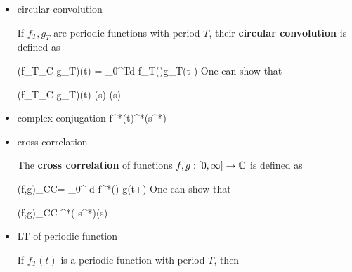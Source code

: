 \begin{itemize}
It's not hard to show that

\beq
f\circledast g = g\circledast f
\eeq
and that

\beq
(f\circledast  g)(t) \maparrow{\call}(s)(s)
\label{eq-lt-conv}
\eeq
Eq.(\ref{eq-lt-conv})
is easy to check
with phasors.
Indeed, if we substitute
$f(\tau)=e^{i\omega_0\tau}\TIL{f}$
and
$g(t-\tau)=
e^{i\omega_0(t-\tau)}\TIL{g}$,
on the right side
of Eq.(\ref{eq-conv-left-half-zero}),
the right side
becomes $e^{i\omega_0t}\TIL{f}
\TIL{g}$,
and the LT of that
is $\TIL{f}
\TIL{g}$.

A common question
is how does one
evaluate
convolutions in practice.
If one can sample and remember
the waveforms $f(\tau)$
and $g(\tau)$
for all $\tau\in[0,t]$,
then it's just a matter
of multiplication
and addition of samples.
Sometimes, even if we
have no memory resources,
it's possible to calculate a convolution. For example,
if $g(t)=e^{st}\heavy_0(t)$

\beqa
(f\circledast g)(t)
&=&
\int_0^t d\tau\;
f(\tau)e^{s(t-\tau)}
\\
&=&
_
{g(t)}(s)
\eeqa
so convolving this $g(\cdot)$
merely evaluates it at $t$
and multiplies it
by a constant $\TIL{f}(s)$.

\item circular convolution

If $f_T, g_T$ are
periodic functions
with period $T$,
their
{\bf circular convolution}
is defined as

\beq
(f_T\circledast_C g_T)(t)
=
\int_0^Td\tau\;
f_T(\tau)g_T(t-\tau)
\eeq
One can show that

\beq
(f_T\circledast_C g_T)(t)
\maparrow{\call}
(s) (s)
\eeq

\item complex
conjugation
\beq
f^*(t)\maparrow{\call}^*(s^*)
\eeq

\item cross correlation

The {\bf cross correlation}
of functions $f,g:[0, \infty]\rightarrow{ \mathbb{C}}$
is defined as

\beq
(f,g)_{CC}=
\int_0^\infty
d\tau\;
f^*(\tau)
g(t+\tau)
\eeq
One can show that

\beq
(f,g)_{CC}
\maparrow{\call}
^*(-s^*)(s)
\eeq

\item LT of periodic function

If $f_T(t)$ is a periodic function
with period $T$, then


\end{itemize}
